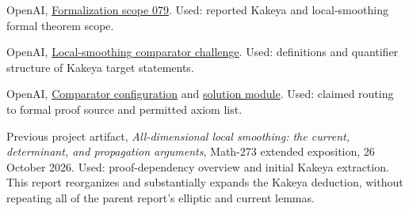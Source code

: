 \documentclass[11pt,a4paper]{article}
\numberwithin{equation}{section}
\theoremstyle{definition}
\theoremstyle{remark}
\newcommand{\pinlink}[2]{\href{https://github.com/openai/math/blob/7ef5c0cc5ca4b0e072b7a050fca09ab24bc6fa3a/#1}{#2}}
\begin{document}
\begin{thebibliography}{99}
 OpenAI,
\pinlink{lean/docs/079.md}{Formalization scope 079}.
Used: reported Kakeya and local-smoothing formal theorem scope.

 OpenAI,
\pinlink{lean/ComparatorChallenges/LocalSmoothing.lean}{Local-smoothing comparator challenge}.
Used: definitions and quantifier structure of Kakeya target statements.

 OpenAI,
\pinlink{lean/ComparatorChallenges/LocalSmoothing.json}{Comparator
configuration} and
\pinlink{lean/OAI/Analysis/Fourier/LocalSmoothing/Comparator.lean}{solution
module}. Used: claimed routing to formal proof source and permitted axiom list.

 Previous project artifact,
\emph{All-dimensional local smoothing: the current, determinant, and
propagation arguments}, Math-273 extended exposition, 26 October 2026.
Used: proof-dependency overview and initial Kakeya extraction. This
report reorganizes and substantially expands the Kakeya deduction,
without repeating all of the parent report's elliptic and current lemmas.
\end{thebibliography}
\end{document}
